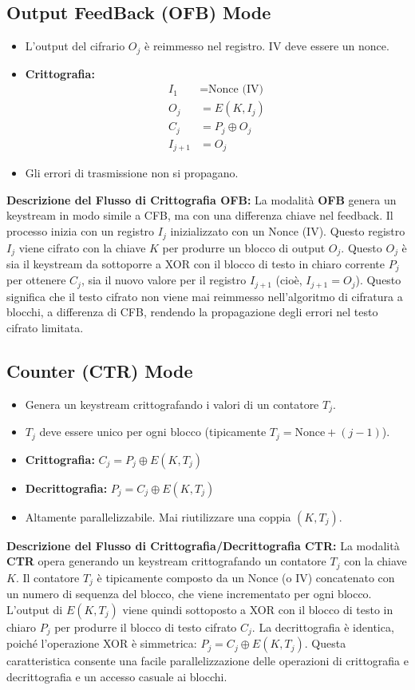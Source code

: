 \subsection{Output FeedBack (OFB) Mode}
\begin{itemize}
    \item L'output del cifrario $O_j$ è reimmesso nel registro. IV deve essere un nonce.
    \item \textbf{Crittografia:}
    \begin{align*}
        I_1 &= \text{Nonce (IV)} \\
        O_j &= E(K, I_j) \\
        C_j &= P_j \oplus O_j \\
        I_{j+1} &= O_j
    \end{align*}
    \item Gli errori di trasmissione non si propagano.
\end{itemize}
\textbf{Descrizione del Flusso di Crittografia OFB:}
La modalità \textbf{OFB} genera un keystream in modo simile a CFB, ma con una differenza chiave nel feedback. Il processo inizia con un registro $I_j$ inizializzato con un Nonce (IV). Questo registro $I_j$ viene cifrato con la chiave $K$ per produrre un blocco di output $O_j$. Questo $O_j$ è sia il keystream da sottoporre a XOR con il blocco di testo in chiaro corrente $P_j$ per ottenere $C_j$, sia il nuovo valore per il registro $I_{j+1}$ (cioè, $I_{j+1} = O_j$). Questo significa che il testo cifrato non viene mai reimmesso nell'algoritmo di cifratura a blocchi, a differenza di CFB, rendendo la propagazione degli errori nel testo cifrato limitata.

\subsection{Counter (CTR) Mode}
\begin{itemize}
    \item Genera un keystream crittografando i valori di un contatore $T_j$.
    \item $T_j$ deve essere unico per ogni blocco (tipicamente $T_j = \text{Nonce} + (j-1)$).
    \item \textbf{Crittografia:} $C_j = P_j \oplus E(K, T_j)$
    \item \textbf{Decrittografia:} $P_j = C_j \oplus E(K, T_j)$
    \item Altamente parallelizzabile. Mai riutilizzare una coppia $(K, T_j)$.
\end{itemize}
\textbf{Descrizione del Flusso di Crittografia/Decrittografia CTR:}
La modalità \textbf{CTR} opera generando un keystream crittografando un contatore $T_j$ con la chiave $K$. Il contatore $T_j$ è tipicamente composto da un Nonce (o IV) concatenato con un numero di sequenza del blocco, che viene incrementato per ogni blocco. L'output di $E(K, T_j)$ viene quindi sottoposto a XOR con il blocco di testo in chiaro $P_j$ per produrre il blocco di testo cifrato $C_j$. La decrittografia è identica, poiché l'operazione XOR è simmetrica: $P_j = C_j \oplus E(K, T_j)$. Questa caratteristica consente una facile parallelizzazione delle operazioni di crittografia e decrittografia e un accesso casuale ai blocchi.

